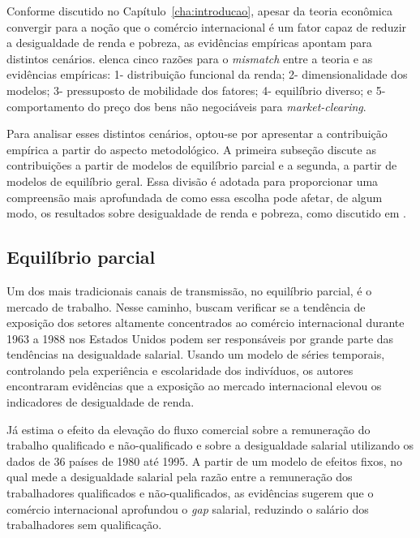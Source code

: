 Conforme discutido no Capítulo~\ref{cha:introducao}, apesar da teoria econômica convergir para a noção que o comércio internacional é um fator capaz de reduzir a desigualdade de renda e pobreza, as evidências empíricas apontam para distintos cenários. \textcite{winters02} elenca cinco razões para o \textit{mismatch} entre a teoria e as evidências empíricas: 1- distribuição funcional da renda; 2- dimensionalidade dos modelos; 3- pressuposto de mobilidade dos fatores; 4- equilíbrio diverso; e 5- comportamento do preço dos bens não negociáveis para \textit{market-clearing}.

Para analisar esses distintos cenários, optou-se por apresentar a contribuição empírica a partir do aspecto metodológico. A primeira subseção discute as contribuições a partir de modelos de equilíbrio parcial e a segunda, a partir de modelos de equilíbrio geral. Essa divisão é adotada para proporcionar uma compreensão mais aprofundada de como essa escolha pode afetar, de algum modo, os resultados sobre desigualdade de renda e pobreza, como discutido em \textcite{anderson20}.


\subsection{Equilíbrio parcial} \label{subsec:eq_parcial}

Um dos mais tradicionais canais de transmissão, no equilíbrio parcial, é o mercado de trabalho. Nesse caminho, \textcite{borjas94} buscam verificar se a tendência de exposição dos setores altamente concentrados ao comércio internacional durante 1963 a 1988 nos Estados Unidos podem ser responsáveis por grande parte das tendências na desigualdade salarial. Usando um modelo de séries temporais, controlando pela experiência e escolaridade dos indivíduos, os autores encontraram evidências que a exposição ao mercado internacional elevou os indicadores de desigualdade de renda.

Já \textcite{forbes01} estima o efeito da elevação do fluxo comercial sobre a remuneração do trabalho qualificado e não-qualificado e sobre a desigualdade salarial utilizando os dados de 36 países de 1980 até 1995. A partir de um modelo de efeitos fixos, no qual mede a desigualdade salarial pela razão entre a remuneração dos trabalhadores qualificados e não-qualificados, as evidências sugerem que o comércio internacional aprofundou o \textit{gap} salarial, reduzindo o salário dos trabalhadores sem qualificação.

